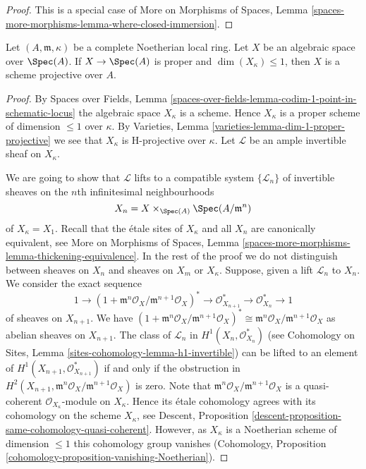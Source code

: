 \begin{proof}
This is a special case of
More on Morphisms of Spaces, Lemma
\ref{spaces-more-morphisms-lemma-where-closed-immersion}.
\end{proof}

\begin{lemma}
\label{lemma-projective-over-complete}
Let $(A, \mathfrak m, \kappa)$ be a complete Noetherian local ring.
Let $X$ be an algebraic space over $\Spec(A)$.
If $X \to \Spec(A)$ is proper and $\dim(X_\kappa) \leq 1$, then
$X$ is a scheme projective over $A$.
\end{lemma}

\begin{proof}
By Spaces over Fields, Lemma
\ref{spaces-over-fields-lemma-codim-1-point-in-schematic-locus}
the algebraic space $X_\kappa$ is a scheme. Hence $X_\kappa$
is a proper scheme of dimension $\leq 1$ over $\kappa$.
By Varieties, Lemma \ref{varieties-lemma-dim-1-proper-projective}
we see that $X_\kappa$ is H-projective over $\kappa$.
Let $\mathcal{L}$ be an ample invertible sheaf on $X_\kappa$.

\medskip\noindent
We are going to show that $\mathcal{L}$ lifts to a compatible system
$\{\mathcal{L}_n\}$ of
invertible sheaves on the $n$th infinitesimal neighbourhoods
$$
X_n = X \times_{\Spec(A)} \Spec(A/\mathfrak m^n)
$$
of $X_\kappa = X_1$. Recall that the \'etale sites of $X_\kappa$
and all $X_n$ are canonically equivalent, see
More on Morphisms of Spaces, Lemma
\ref{spaces-more-morphisms-lemma-thickening-equivalence}.
In the rest of the proof we do not distinguish between sheaves on $X_n$
and sheaves on $X_m$ or $X_\kappa$.
Suppose, given a lift $\mathcal{L}_n$ to $X_n$. We consider
the exact sequence
$$
1 \to
(1 + \mathfrak m^n\mathcal{O}_X/\mathfrak m^{n + 1}\mathcal{O}_X)^* \to
\mathcal{O}_{X_{n + 1}}^* \to \mathcal{O}_{X_n}^* \to 1
$$
of sheaves on $X_{n + 1}$. We have
$(1 + \mathfrak m^n\mathcal{O}_X/\mathfrak m^{n + 1}\mathcal{O}_X)^*
\cong \mathfrak m^n\mathcal{O}_X/\mathfrak m^{n + 1}\mathcal{O}_X$
as abelian sheaves on $X_{n + 1}$. The class of $\mathcal{L}_n$ in
$H^1(X_n, \mathcal{O}_{X_n}^*)$ (see
Cohomology on Sites, Lemma \ref{sites-cohomology-lemma-h1-invertible})
can be lifted to an element of $H^1(X_{n + 1}, \mathcal{O}_{X_{n + 1}}^*)$
if and only if the obstruction in
$H^2(X_{n + 1}, \mathfrak m^n\mathcal{O}_X/\mathfrak m^{n + 1}\mathcal{O}_X)$
is zero. Note that
$\mathfrak m^n\mathcal{O}_X/\mathfrak m^{n + 1}\mathcal{O}_X$
is a quasi-coherent $\mathcal{O}_{X_\kappa}$-module on $X_\kappa$.
Hence its \'etale cohomology agrees with its cohomology on the
scheme $X_\kappa$, see
Descent, Proposition \ref{descent-proposition-same-cohomology-quasi-coherent}.
However, as $X_\kappa$ is a Noetherian scheme of dimension $\leq 1$
this cohomology group vanishes (Cohomology, Proposition
\ref{cohomology-proposition-vanishing-Noetherian}).


\end{proof}

